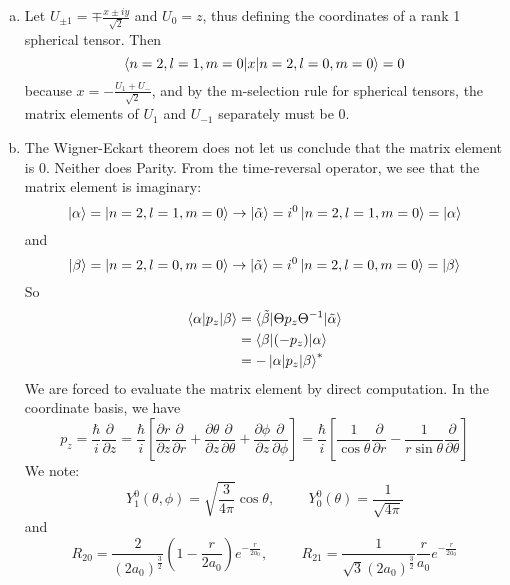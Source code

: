 \documentclass[12pt, letterpaper]{article}
\begin{document}
\begin{enumerate}
    \begin{enumerate}[(a)]
\item 
Let $U_{\pm 1}=\mp\frac{x\pm iy}{\sqrt{2}}$ and $U_0=z$, thus defining the coordinates of a rank 1 spherical tensor. Then
\begin{equation}
        \braket{n=2,l=1,m=0|x|n=2,l=0,m=0}=0
\end{equation}
because $x=-\frac{U_1+U_-}{\sqrt{2}}$, and by the m-selection rule for spherical tensors, the matrix elements of $U_1$ and $U_{-1}$ separately must be $0$.
\item The Wigner-Eckart theorem does not let us conclude that the matrix element is $0$. Neither does Parity. From the time-reversal operator, we see that the matrix element is imaginary:
\begin{equation}
    \ket{\alpha}=\ket{n=2,l=1,m=0}\rightarrow \ket{\tilde{\alpha}}=i^0\ket{n=2,l=1,m=0}=\ket{\alpha}
\end{equation}
and 
\begin{equation}
    \ket{\beta}=\ket{n=2,l=0,m=0}\rightarrow \ket{\tilde{\alpha}}=i^0\ket{n=2,l=0,m=0}=\ket{\beta}
\end{equation}
So
\begin{align}
        \braket{\alpha|p_z|\beta}&=\braket{\tilde{\beta}|\Theta p_z\Theta^{-1}|\tilde{\alpha}}\\&=\braket{\beta|(-p_z)|\alpha}\\&=-\ket{\alpha|p_z|\beta}^*
\end{align}
We are forced to evaluate the matrix element by direct computation. In the coordinate basis, we have
\begin{equation}
    p_z=\frac{\hbar}{i}\frac{\partial}{\partial z}=\frac{\hbar}{i}\left[\frac{\partial r}{\partial z}\frac{\partial}{\partial r}+\frac{\partial \theta}{\partial z}\frac{\partial}{\partial \theta}+\frac{\partial \phi}{\partial z}\frac{\partial}{\partial \phi}\right]=\frac{\hbar}{i}\left[\frac{1}{\cos{\theta}}\frac{\partial}{\partial r}-\frac{1}{r\sin{\theta}}\frac{\partial}{\partial \theta}\right]
\end{equation}
We note:
\begin{equation}
    Y_1^0(\theta,\phi)=\sqrt{\frac{3}{4\pi}}\cos{\theta},\hspace{1cm}Y_0^0(\theta)=\frac{1}{\sqrt{4\pi}}
\end{equation}
and 
\begin{equation}
    R_{20}=\frac{2}{(2a_0)^{\frac{3}{2}}}\left(1-\frac{r}{2a_0}\right)e^{-\frac{r}{2a_0}},\hspace{1cm}R_{21}=\frac{1}{\sqrt{3}(2a_0)^{\frac{3}{2}}}\frac{r}{a_0}e^{-\frac{r}{2a_0}}

\end{equation}
\end{enumerate}
\end{enumerate}
\end{document}
